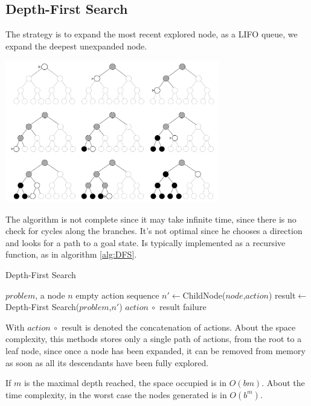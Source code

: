 \documentclass[10pt, letterpaper]{report}
\begin{document}
\subsection{Depth-First Search}
The strategy is to expand the most recent explored node, as a LIFO queue, we expand the deepest unexpanded node. 
\begin{center}
    \includegraphics[width=0.7\textwidth ]{images/dfs.png}
\end{center}
The algorithm is not complete since it may take infinite time, since there is no check for cycles along the branches. It's not optimal since he chooses a direction and looks for a path to a goal state. Is typically implemented as a recursive function, as in algorithm \ref{alg:DFS}.\bigskip

\begin{algorithm}
    \caption{Depth-First Search}\label{alg:DFS}
    \begin{algorithmic}
    \Require $problem$, a node $n$
    \State\Return empty action sequence
    \EndIf
    \State $n'\leftarrow$ChildNode($node$,$action$)
    \State result$\leftarrow$Depth-First Search($problem$,$n'$)
    \State\Return $action \ \circ$ result
    \EndIf
    \EndFor
    \State\Return failure
    \end{algorithmic}
\end{algorithm}

\noindent With $action \ \circ$ result is denoted the concatenation of actions. 
About the space complexity, this methods stores only a single path of actions, from the root to a leaf node, since once a
 node has been expanded, it can be removed from memory as soon as all its
 descendants have been fully explored.

 If $m$ is the maximal depth reached, the space occupied is in $O(bm)$. About the time complexity, in the worst case the nodes generated is in $O(b^m)$.
\end{document}
